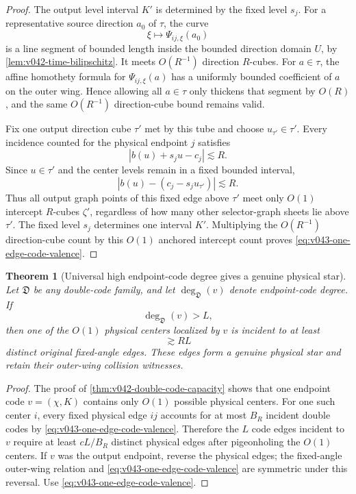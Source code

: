 \documentclass[10pt]{article}
\newtheorem{theorem}{Theorem}[section]
\begin{document}
\begin{proof}
The output level interval \(K'\) is determined by the fixed level \(s_j\).  For a representative
source direction \(a_0\) of \(\tau\), the curve
\[
\xi
\longmapsto
\Psi_{ij,\xi}(a_0)
\]
is a line segment of bounded length inside the bounded direction domain \(U\), by
\cref{lem:v042-time-bilipschitz}.  It meets \(O(R^{-1})\) direction \(R\)-cubes.  For
\(a\in\tau\), the affine homothety formula for \(\Psi_{ij,\xi}(a)\) has a uniformly bounded
coefficient of \(a\) on the outer wing.  Hence allowing all \(a\in\tau\) only thickens that segment
by \(O(R)\), and the same \(O(R^{-1})\) direction-cube bound remains valid.

Fix one output direction cube \(\tau'\) met by this tube and choose \(u_{\tau'}\in\tau'\).
Every incidence counted for the physical endpoint \(j\) satisfies
\[
|b(u)+s_ju-c_j|
\lesssim
R.
\]
Since \(u\in\tau'\) and the center levels remain in a fixed bounded interval,
\[
|b(u)-(c_j-s_ju_{\tau'})|
\lesssim
R.
\]
Thus all output graph points of this fixed edge above \(\tau'\) meet only \(O(1)\) intercept
\(R\)-cubes \(\zeta'\), regardless of how many other selector-graph sheets lie above
\(\tau'\).  The fixed level \(s_j\) determines one interval \(K'\).  Multiplying the
\(O(R^{-1})\) direction-cube count by this \(O(1)\) anchored intercept count proves
\eqref{eq:v043-one-edge-code-valence}.
\end{proof}

\begin{theorem}[Universal high endpoint-code degree gives a genuine physical star]
\label{thm:v043-code-degree-to-star}
Let \(\mathfrak D\) be any double-code family, and let
\(\deg_{\mathfrak D}(v)\) denote endpoint-code degree.  If
\[
\deg_{\mathfrak D}(v)>L,
\]
then one of the \(O(1)\) physical centers localized by \(v\) is incident to at least
\begin{equation}
\label{eq:v043-code-degree-to-star}
\boxed{
\gtrsim
RL
}
\end{equation}
distinct original fixed-angle edges.  These edges form a genuine physical star and retain their
outer-wing collision witnesses.
\end{theorem}

\begin{proof}
The proof of \cref{thm:v042-double-code-capacity} shows that one endpoint code \(v=(\chi,K)\)
contains only \(O(1)\) possible physical centers.  For one such center \(i\), every fixed physical
edge \(ij\) accounts for at most \(B_R\) incident double codes by
\eqref{eq:v043-one-edge-code-valence}.  Therefore the \(L\) code edges incident to \(v\) require at
least \(cL/B_R\) distinct physical edges after pigeonholing the \(O(1)\) centers.  If \(v\) was
the output endpoint, reverse the physical edges; the fixed-angle outer-wing relation and
\eqref{eq:v043-one-edge-code-valence} are symmetric under this reversal.  Use
\eqref{eq:v043-one-edge-code-valence}.
\end{proof}
\end{document}
